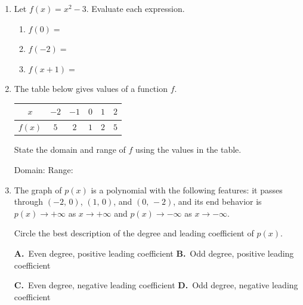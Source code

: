 \documentclass[10pt]{article}
\begin{document}
\namedateperiod

\vspace{0.12in}

\begin{enumerate}[itemsep=14pt]

\item Let $f(x) = x^2 - 3$. Evaluate each expression.

      \medskip
      \begin{enumerate}[label=(\alph*), itemsep=6pt]
        \item $f(0) = $ \blank{3cm}
        \item $f(-2) = $ \blank{3cm}
        \item $f(x+1) = $ \blank{5cm}
      \end{enumerate}

\item The table below gives values of a function $f$.

      \medskip
      \renewcommand{\arraystretch}{1.3}
      \begin{tabular}{|c|c|c|c|c|c|}
      \hline
      $x$    & $-2$ & $-1$ & $0$ & $1$ & $2$ \\
      \hline
      $f(x)$ & $5$  & $2$  & $1$ & $2$ & $5$ \\
      \hline
      \end{tabular}

      \medskip
      State the domain and range of $f$ using the values in the table.

      \vspace{0.08in}
      Domain: \blank{5cm} \quad Range: \blank{5cm}

\item The graph of $p(x)$ is a polynomial with the following features: it passes through
      $(-2,\,0)$, $(1,\,0)$, and $(0,\,-2)$, and its end behavior is
      $p(x) \to +\infty$ as $x \to +\infty$ and $p(x) \to -\infty$ as $x \to -\infty$.

      Circle the best description of the degree and leading coefficient of $p(x)$.

      \medskip
      \textbf{A.}\ Even degree, positive leading coefficient \qquad
      \textbf{B.}\ Odd degree, positive leading coefficient

      \medskip
      \textbf{C.}\ Even degree, negative leading coefficient \qquad
      \textbf{D.}\ Odd degree, negative leading coefficient

\end{enumerate}
\end{document}
